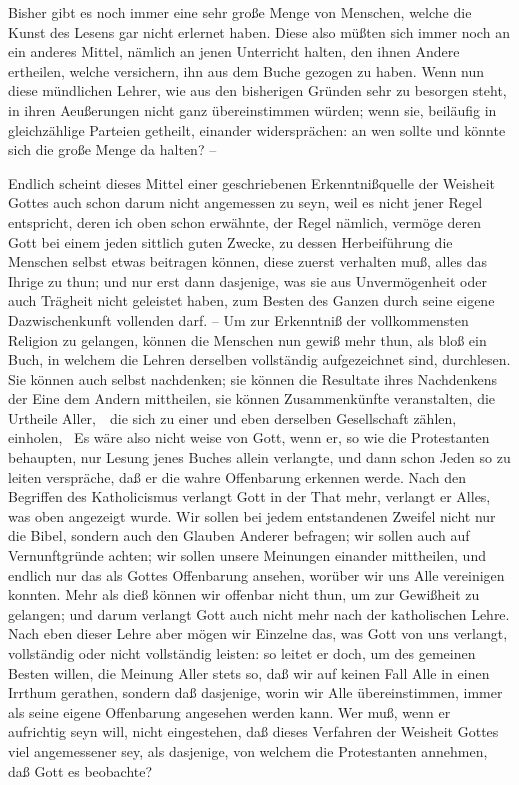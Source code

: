 \begin{aufza}
\begin{aufzb}
\item Bisher gibt es noch immer eine sehr große Menge von Menschen, welche die Kunst des Lesens gar nicht erlernet haben. Diese also müßten sich immer noch an ein anderes Mittel, nämlich an jenen Unterricht halten, den ihnen Andere ertheilen, welche versichern, ihn aus dem Buche gezogen zu haben. Wenn nun diese mündlichen Lehrer, wie aus den bisherigen Gründen sehr zu besorgen steht, in ihren Aeußerungen nicht ganz übereinstimmen würden; wenn sie, beiläufig in gleichzählige Parteien getheilt, einander widersprächen: an wen sollte und könnte sich die große Menge da halten? --
\item Endlich scheint dieses Mittel einer geschriebenen Erkenntnißquelle der Weisheit Gottes auch schon darum nicht angemessen zu seyn, weil es nicht jener Regel entspricht, deren ich oben schon erwähnte, der Regel nämlich, vermöge deren Gott bei einem jeden sittlich guten Zwecke, zu dessen Herbeiführung die Menschen selbst etwas beitragen können, diese zuerst verhalten muß, alles das Ihrige zu thun; und nur erst dann dasjenige, was sie aus Unvermögenheit oder auch Trägheit nicht geleistet haben, zum Besten des Ganzen durch seine eigene Dazwischenkunft vollenden darf. -- Um zur Erkenntniß der vollkommensten Religion zu gelangen, können die Menschen nun gewiß mehr thun, als bloß ein Buch, in welchem die Lehren derselben vollständig aufgezeichnet sind, durchlesen.
Sie können auch selbst nachdenken; sie können die Resultate ihres Nachdenkens der Eine dem Andern mittheilen, sie können Zusammenkünfte veranstalten, die Urtheile Aller,~\ die sich zu einer und eben derselben Gesellschaft zählen, einholen, \usw\ Es wäre also nicht weise von Gott, wenn er, so wie die Protestanten behaupten, nur Lesung jenes Buches allein verlangte, und dann schon Jeden so zu leiten verspräche, daß er die wahre Offenbarung erkennen werde. Nach den Begriffen des Katholicismus verlangt Gott in der That mehr, verlangt er Alles, was oben angezeigt wurde. Wir sollen bei jedem entstandenen Zweifel nicht nur die Bibel, sondern auch den Glauben Anderer befragen; wir sollen auch auf Vernunftgründe achten; wir sollen unsere Meinungen einander mittheilen, und endlich nur das als Gottes Offenbarung ansehen, worüber wir uns Alle vereinigen konnten. Mehr als dieß können wir offenbar nicht thun, um zur Gewißheit zu gelangen; und darum verlangt Gott auch nicht mehr nach der katholischen Lehre. Nach eben dieser Lehre aber mögen wir Einzelne das, was Gott von uns verlangt, vollständig oder nicht vollständig leisten: so leitet er doch, um des gemeinen Besten willen, die Meinung Aller stets so, daß wir auf keinen Fall Alle in einen Irrthum gerathen, sondern daß dasjenige, worin wir Alle übereinstimmen, immer als seine eigene Offenbarung angesehen werden kann. Wer muß, wenn er aufrichtig seyn will, nicht eingestehen, daß dieses Verfahren der Weisheit Gottes viel angemessener sey, als dasjenige, von welchem die Protestanten annehmen, daß Gott es beobachte?

\end{aufzb}
\end{aufza}

